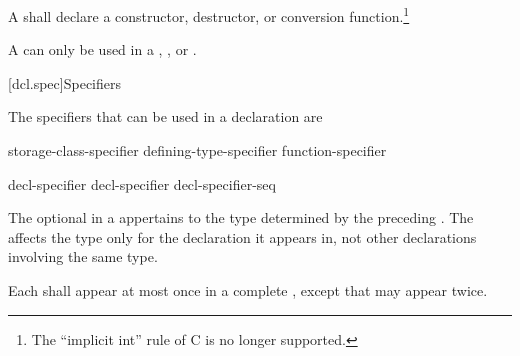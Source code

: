 \pnum
A  shall declare a
constructor, destructor, or conversion function.\footnote{The
``implicit int'' rule of C is no longer supported.}
\begin{note}
A  can only be used in a
,
, or
.
\end{note}

[dcl.spec]{Specifiers}%

\pnum
{}%
The specifiers that can be used in a declaration are

\begin{bnf}
\br
    storage-class-specifier\br
    defining-type-specifier\br
    function-specifier\br
    \br
    \br
    \br
\end{bnf}

\begin{bnf}
\br
    decl-specifier \br
    decl-specifier decl-specifier-seq
\end{bnf}

The optional  in a 
appertains to the type determined by the preceding
. The 
affects the type only for the declaration it appears in, not other declarations involving the
same type.

\pnum
Each  shall appear at most once in a complete
, except that
 may appear twice.

